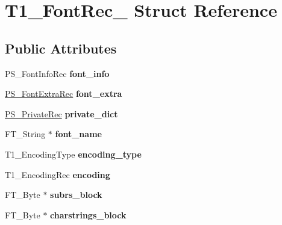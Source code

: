 \hypertarget{struct_t1___font_rec__}{
\section{T1\_\-FontRec\_\- Struct Reference}
\label{struct_t1___font_rec__}
}
\subsection*{Public Attributes}
\begin{DoxyCompactItemize}
\item 
\hypertarget{struct_t1___font_rec___a38098edc6279f539983e0d4694b9949a}{
PS\_\-FontInfoRec {\bfseries font\_\-info}}
\label{struct_t1___font_rec___a38098edc6279f539983e0d4694b9949a}

\item 
\hypertarget{struct_t1___font_rec___a8f2f0990ef8ab29e961047b8c2ceca0d}{
\hyperlink{struct_p_s___font_extra_rec__}{PS\_\-FontExtraRec} {\bfseries font\_\-extra}}
\label{struct_t1___font_rec___a8f2f0990ef8ab29e961047b8c2ceca0d}

\item 
\hypertarget{struct_t1___font_rec___a14386570a1b12e477407836e470a258f}{
\hyperlink{struct_p_s___private_rec__}{PS\_\-PrivateRec} {\bfseries private\_\-dict}}
\label{struct_t1___font_rec___a14386570a1b12e477407836e470a258f}

\item 
\hypertarget{struct_t1___font_rec___a878fc12d0ddda382ffc09c27a7ed81ad}{
FT\_\-String $\ast$ {\bfseries font\_\-name}}
\label{struct_t1___font_rec___a878fc12d0ddda382ffc09c27a7ed81ad}

\item 
\hypertarget{struct_t1___font_rec___a20cb798239623daa4ac7fe833a2a9dc9}{
T1\_\-EncodingType {\bfseries encoding\_\-type}}
\label{struct_t1___font_rec___a20cb798239623daa4ac7fe833a2a9dc9}

\item 
\hypertarget{struct_t1___font_rec___a78de0ca49e25ea59a2736ec5837c77b4}{
T1\_\-EncodingRec {\bfseries encoding}}
\label{struct_t1___font_rec___a78de0ca49e25ea59a2736ec5837c77b4}

\item 
\hypertarget{struct_t1___font_rec___a46675e2cba990def15e0ea01b11578a7}{
FT\_\-Byte $\ast$ {\bfseries subrs\_\-block}}
\label{struct_t1___font_rec___a46675e2cba990def15e0ea01b11578a7}

\item 
\hypertarget{struct_t1___font_rec___a8985630587cf6364837fe172391cfadb}{
FT\_\-Byte $\ast$ {\bfseries charstrings\_\-block}}
\label{struct_t1___font_rec___a8985630587cf6364837fe172391cfadb}


\end{DoxyCompactItemize}
